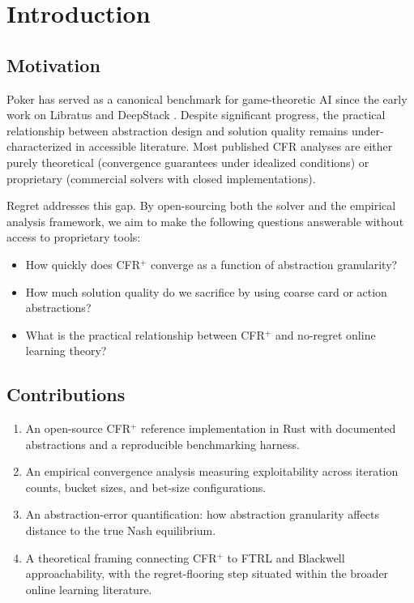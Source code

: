 \section{Introduction}
\label{sec:introduction}

\subsection{Motivation}

Poker has served as a canonical benchmark for game-theoretic AI since the
early work on Libratus \citep{brown2017libratus} and DeepStack
\citep{moravcik2017deepstack}. Despite significant progress, the practical
relationship between abstraction design and solution quality remains
under-characterized in accessible literature. Most published CFR analyses are
either purely theoretical (convergence guarantees under idealized conditions)
or proprietary (commercial solvers with closed implementations).

Regret addresses this gap. By open-sourcing both the solver and the empirical
analysis framework, we aim to make the following questions answerable without
access to proprietary tools:
\begin{itemize}
  \item How quickly does CFR$^+$ converge as a function of abstraction
        granularity?
  \item How much solution quality do we sacrifice by using coarse card or
        action abstractions?
  \item What is the practical relationship between CFR$^+$ and no-regret
        online learning theory?
\end{itemize}

\subsection{Contributions}

\begin{enumerate}
  \item An open-source CFR$^+$ reference implementation in Rust with
        documented abstractions and a reproducible benchmarking harness.
  \item An empirical convergence analysis measuring exploitability across
        iteration counts, bucket sizes, and bet-size configurations.
  \item An abstraction-error quantification: how abstraction granularity
        affects distance to the true Nash equilibrium.
  \item A theoretical framing connecting CFR$^+$ to FTRL and Blackwell
        approachability, with the regret-flooring step situated within the
        broader online learning literature.
\end{enumerate}
